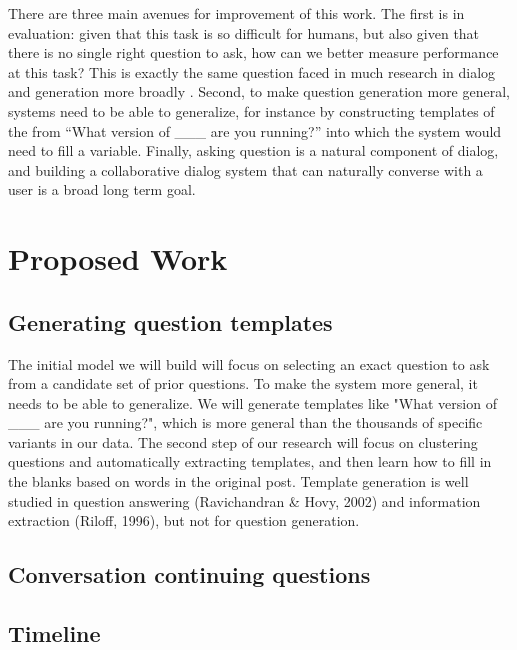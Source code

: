 \documentclass[11pt]{article}
\begin{document}
There are three main avenues for improvement of this work.
The first is in evaluation: given that this task is so difficult for humans, but also given that there is no single right question to ask, how can we better measure performance at this task?
This is exactly the same question faced in much research in dialog and generation more broadly \cite{paek2001empirical,lowe2015ubuntu,liu2016not,kannan2017adversarial}.
Second, to make question generation more general, systems need to be able to generalize, for instance by constructing templates of the from ``What version of \_\_\_ are you running?'' into which the system would need to fill a variable. Finally, asking question is a natural component of dialog, and building a collaborative dialog system that can naturally converse with a user is a broad long term goal.


\section{Proposed Work}

\subsection{Generating question templates}

The initial model we will build will focus on selecting an exact question to ask from a candidate set of prior questions. To make the system more general, it needs to be able to generalize. We will generate templates like "What version of \_\_\_ are you running?", which is more general than the thousands of specific variants in our data. The second step of our research will focus on clustering questions and automatically extracting templates, and then learn how to fill in the blanks based on words in the original post. Template generation is well studied in question answering (Ravichandran \& Hovy, 2002) and information extraction (Riloff, 1996), but not for question generation.

\subsection{Conversation continuing questions}

\subsection{Timeline}

\section{}
\end{document}
